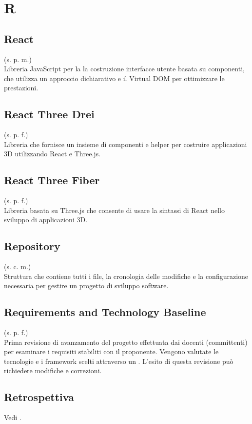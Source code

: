 \section{R}
    \subsection{React}
    (s. p. m.)\\
    Libreria JavaScript per la la costruzione interfacce utente basata su componenti, che utilizza un 
    approccio dichiarativo e il Virtual DOM per ottimizzare le prestazioni.
    \subsection{React Three Drei}
    \label{React Three Drei}
    (s. p. f.)\\
    Libreria che fornisce un insieme di componenti e helper per 
    costruire applicazioni 3D utilizzando React e Three.js.
    \subsection{React Three Fiber}
    \label{React Three Fiber}
    (s. p. f.)\\
    Libreria basata su Three.js che consente di usare la sintassi
    di React nello sviluppo di applicazioni 3D.
    \subsection{Repository}
    \label{Repository}
    (s. c. m.)\\
    Struttura che contiene tutti i file, la cronologia delle modifiche e la 
    configurazione necessaria per gestire un progetto di sviluppo software.
    \subsection{Requirements and Technology Baseline}
    \label{Requirements and Technology Baseline}
    (s. p. f.)\\
    Prima revisione di avanzamento del progetto effettuata dai docenti (committenti) 
    per esaminare i requisiti stabiliti con il proponente. Vengono valutate le 
    tecnologie e i framework scelti attraverso un . 
    L'esito di questa revisione può richiedere modifiche e correzioni.
    \subsection{Retrospettiva}
    Vedi .
